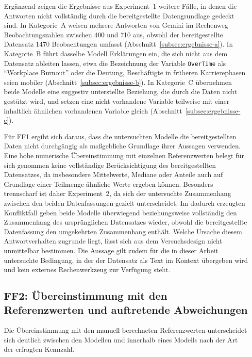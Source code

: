 Ergänzend zeigen die Ergebnisse aus Experiment~1 weitere Fälle, in denen die Antworten nicht vollständig durch die bereitgestellte Datengrundlage gedeckt sind. In Kategorie~A weisen mehrere Antworten von Gemini im Rechenweg Beobachtungszahlen zwischen 400 und 710 aus, obwohl der bereitgestellte Datensatz 1470 Beobachtungen umfasst (Abschnitt~\ref{subsec:ergebnisse-a}). In Kategorie~B führt dasselbe Modell Erklärungen ein, die sich nicht aus dem Datensatz ableiten lassen, etwa die Bezeichnung der Variable \texttt{OverTime} als \enquote{Workplace Burnout} oder die Deutung, Beschäftigte in früheren Karrierephasen seien mobiler (Abschnitt~\ref{subsec:ergebnisse-b}). In Kategorie~C übernehmen beide Modelle eine suggestiv unterstellte Beziehung, die durch die Daten nicht gestützt wird, und setzen eine nicht vorhandene Variable teilweise mit einer inhaltlich ähnlichen vorhandenen Variable gleich (Abschnitt~\ref{subsec:ergebnisse-c}).

Für FF1 ergibt sich daraus, dass die untersuchten Modelle die bereitgestellten Daten nicht durchgängig als maßgebliche Grundlage ihrer Aussagen verwenden. Eine hohe numerische Übereinstimmung mit einzelnen Referenzwerten belegt für sich genommen keine vollständige Berücksichtigung des bereitgestellten Datensatzes, da insbesondere Mittelwerte, Mediane oder Anteile auch auf Grundlage einer Teilmenge ähnliche Werte ergeben können. Besonders trennscharf ist daher Experiment~2, da sich der untersuchte Zusammenhang zwischen den beiden Datenfassungen gezielt unterscheidet. Im dadurch erzeugten Konfliktfall geben beide Modelle überwiegend beziehungsweise vollständig den Zusammenhang des ursprünglichen Datensatzes wieder, obwohl die bereitgestellte Datenfassung den umgekehrten Zusammenhang enthält. Welche Ursache diesem Antwortverhalten zugrunde liegt, lässt sich aus dem Versuchsdesign nicht unmittelbar bestimmen. Die Aussage gilt zudem für die in dieser Arbeit untersuchte Bedingung, in der der Datensatz als Text im Kontext übergeben wird und kein externes Rechenwerkzeug zur Verfügung steht.

\subsection{FF2: Übereinstimmung mit den Referenzwerten und auftretende Abweichungen}

Die Übereinstimmung mit den manuell berechneten Referenzwerten unterscheidet sich deutlich zwischen den Modellen und innerhalb eines Modells nach der Art der erfragten Kennzahl.

